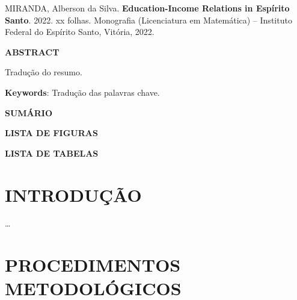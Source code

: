 \documentclass[
  12pt,
  letterpaper,
  DIV=11,
  numbers=noendperiod]{scrartcl}
\newcommand{\nome}{Alberson da Silva}
\newcommand{\sobrenome}{Miranda}
\newcommand{\tituloingles}{Education-Income Relations in Espírito Santo}
\newcommand{\universidade}{Instituto Federal do Espírito Santo}
\newcommand{\curso}{Licenciatura em Matemática}
\newcommand{\cidade}{Vitória}
\newcommand{\ano}{2022}
\begin{document}
\newpage
\thispagestyle{empty}

\begin{singlespace}
\noindent \MakeUppercase{\sobrenome}, \nome. \textbf{\tituloingles}. \ano. xx folhas. Monografia (\curso) -- \universidade, \cidade, \ano.

\vspace{1pc}
\begin{center}
\textbf{ABSTRACT}
\end{center}
\vspace{1pc}

\noindent 
Tradução do resumo.

\vspace{2pc}
\noindent
{\textbf{Keywords}:}  Tradução das palavras chave.
\end{singlespace}

\newpage
\thispagestyle{empty}
\begin{flushleft}
\begingroup
\let\clearpage\relax

\newpage
\begin{center}
\MakeUppercase{\textbf{Sumário}}
\end{center}
\begin{center}
\tableofcontents
\end{center}
\end{flushleft}

\newpage
\thispagestyle{empty}
\begin{center}
\MakeUppercase{\textbf{LISTA DE FIGURAS}}
\end{center}
\listoffigures

\newpage
\begin{center}
\MakeUppercase{\textbf{LISTA DE TABELAS}}
\end{center}
\listoftables
\thispagestyle{empty}
\endgroup

\newpage

\hypertarget{introduuxe7uxe3o}{%
\section*{INTRODUÇÃO}\label{introduuxe7uxe3o}}

\ldots{}

\hypertarget{procedimentos-metodoluxf3gicos}{%
\section{PROCEDIMENTOS
METODOLÓGICOS}\label{procedimentos-metodoluxf3gicos}}
\end{document}
